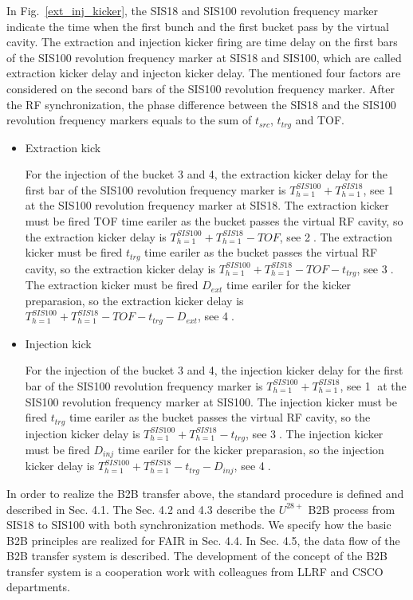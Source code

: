 In Fig.~\ref{ext_inj_kicker}, the SIS18 and SIS100 revolution frequency marker indicate the time when the first bunch and the first bucket pass by the virtual cavity. The extraction and injection kicker firing are time delay on the first bars of the SIS100 revolution frequency marker at SIS18 and SIS100, which are called extraction kicker delay and injecton kicker delay. The mentioned four factors are considered on the second bars of the SIS100 revolution frequency marker. After the RF synchronization, the phase difference between the SIS18 and the SIS100 revolution frequency markers equals to the sum of $t_{src}$, $t_{trg}$ and TOF.   
\begin{itemize}
\item Extraction kick

For the injection of the bucket 3 and 4, the extraction kicker delay for the first bar of the SIS100 revolution frequency marker is $T_{h=1}^{SIS100} + T_{h=1}^{SIS18}$, see \textcircled{1} at the SIS100 revolution frequency marker at SIS18. The extraction kicker must be fired TOF time eariler as the bucket passes the virtual RF cavity, so the extraction kicker delay is $T_{h=1}^{SIS100} + T_{h=1}^{SIS18} - TOF$, see \textcircled{2}. The extraction kicker must be fired $t_{trg}$ time eariler as the bucket passes the virtual RF cavity, so the extraction kicker delay is $T_{h=1}^{SIS100} + T_{h=1}^{SIS18} - TOF - t_{trg}$, see \textcircled{3}. The extraction kicker must be fired $D_{ext}$ time eariler for the kicker preparasion, so the extraction kicker delay is $T_{h=1}^{SIS100} + T_{h=1}^{SIS18} - TOF - t_{trg} - D_{ext}$, see \textcircled{4}.

\item Injection kick

For the injection of the bucket 3 and 4, the injection kicker delay for the first bar of the SIS100 revolution frequency marker is $T_{h=1}^{SIS100} + T_{h=1}^{SIS18}$, see \textcircled{1} at the SIS100 revolution frequency marker at SIS100. The injection kicker  must be fired $t_{trg}$ time eariler as the bucket passes the virtual RF cavity, so the injection kicker delay is $T_{h=1}^{SIS100} + T_{h=1}^{SIS18} -  t_{trg}$, see \textcircled{3}. The injection kicker must be fired $D_{inj}$ time eariler for the kicker preparasion, so the injection kicker delay is $T_{h=1}^{SIS100} + T_{h=1}^{SIS18} - t_{trg} - D_{inj}$, see \textcircled{4}.
\end{itemize}

In order to realize the B2B transfer above, the standard procedure is defined and described in Sec. 4.1. The Sec. 4.2 and 4.3 describe the $U^{28+}$ B2B process from SIS18 to SIS100 with both synchronization methods. We specify how the basic B2B principles are realized for FAIR in Sec. 4.4. In Sec. 4.5, the data flow of the B2B transfer system is described. The development of the concept of the B2B transfer system is a cooperation work with colleagues from LLRF and CSCO departments. 
